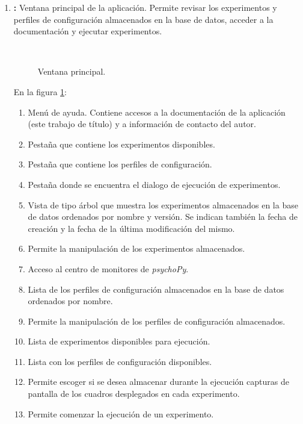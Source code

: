 \documentclass[\main/main.tex]{subfiles}
\begin{document}
			\newpage 
			\begin{enumerate}\setlength\itemsep{-0.5em}
				\item \textbf{:} Ventana principal de la aplicación. Permite revisar los experimentos y perfiles de configuración almacenados en la base de datos, acceder a la documentación y ejecutar experimentos.
				\begin{figure}[H]
					\centering
					\\
					\caption{Ventana principal.}
					\label{fig:03_gui_main}
				\end{figure} 

				\vspace{-5mm}

				En la figura \ref{fig:03_gui_main}:
				\begin{enumerate}[(1)]\setlength\itemsep{-0.5em}
					\item Menú de ayuda. Contiene accesos a la documentación de la aplicación (este trabajo de título) y a información de contacto del autor.
					\item Pestaña que contiene los experimentos disponibles. 
					\item Pestaña que contiene los perfiles de configuración. 
					\item Pestaña donde se encuentra el dialogo de ejecución de experimentos. 
					\item Vista de tipo árbol que muestra los experimentos almacenados en la base de datos ordenados por nombre y versión. Se indican también la fecha de creación y la fecha de la última modificación del mismo.  
					\item Permite la manipulación de los experimentos almacenados. 
					\item Acceso al centro de monitores de \textit{psychoPy}.
					\item Lista de los perfiles de configuración almacenados en la base de datos ordenados por nombre.
					\item Permite la manipulación de los perfiles de configuración almacenados.
					\item Lista de experimentos disponibles para ejecución. 
					\item Lista con los perfiles de configuración disponibles. 
					\item Permite escoger si se desea almacenar durante la ejecución capturas de pantalla de los cuadros desplegados en cada experimento.
					\item Permite comenzar la ejecución de un experimento. 
				\end{enumerate}


\end{enumerate}
\end{document}
